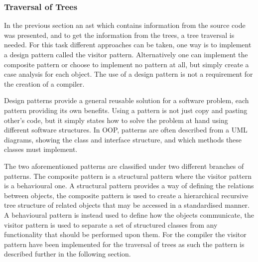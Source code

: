 \subsubsection*{Traversal of Trees}
In the previous section an \acrshort{ast} which contains information from the source code was presented, and to get the information from the trees, a tree traversal is needed.
For this task different approaches can be taken, one way is to implement a design pattern called the visitor pattern.
Alternatively one can implement the composite pattern or choose to implement no pattern at all, but simply create a case analysis for each object.
The use of a design pattern is not a requirement for the creation of a compiler.

Design patterns provide a general reusable solution for a software problem, each pattern providing its own benefits.
Using a pattern is not just copy and pasting other's code, but it simply states how to solve the problem at hand using different software structures.
In OOP, patterns are often described from a UML diagrams, showing the class and interface structure, and which methods these classes must implement. 

The two aforementioned patterns are classified under two different branches of patterns.
The composite pattern is a structural pattern where the visitor pattern is a behavioural one.
A structural pattern provides a way of defining the relations between objects, the composite pattern is used to create a hierarchical recursive tree structure of related objects that may be accessed in a standardised manner.
A behavioural pattern is instead used to define how the objects communicate, the visitor pattern is used to separate a set of structured classes from any functionality that should be performed upon them.
For the compiler the visitor pattern have been implemented for the traversal of trees as such the pattern is described further in the following section. 
